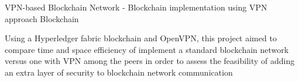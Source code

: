 {VPN-based Blockchain Network - Blockchain implementation using VPN approach \textbar{} Blockchain}
{
\jbegin
    \item{
            Using a Hyperledger fabric blockchain and OpenVPN, this project aimed to compare time and space efficiency
            of implement a standard blockchain network versus one with VPN among the peers in order to assess the feasibility of adding
            an extra layer of security to blockchain network communication
        }
\jend
}
